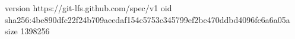 version https://git-lfs.github.com/spec/v1
oid sha256:4be890dfc22f24b709aeedaf154c5753c345799ef2be470ddbd4096fc6a6a05a
size 1398256
